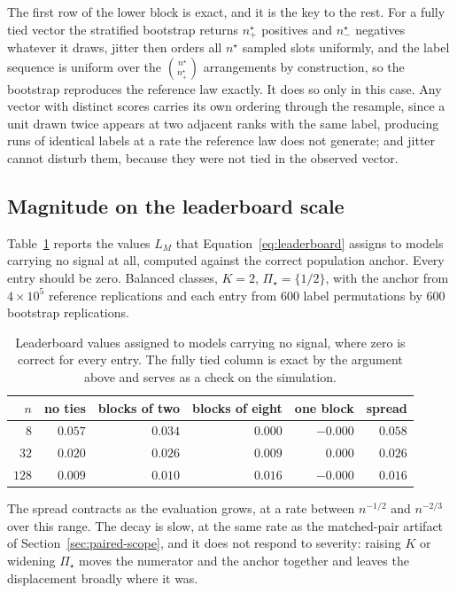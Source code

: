 \documentclass[11pt]{article}
\newcommand{\PSet}{\Pi_\star}
\theoremstyle{remark}
\begin{document}
The first row of the lower block is exact, and it is the key to the rest. For a fully tied vector the stratified bootstrap returns $n^\star_+$ positives and $n^\star_-$ negatives whatever it draws, jitter then orders all $n^\star$ sampled slots uniformly, and the label sequence is uniform over the $\binom{n^\star}{n^\star_+}$ arrangements by construction, so the bootstrap reproduces the reference law exactly. It does so only in this case. Any vector with distinct scores carries its own ordering through the resample, since a unit drawn twice appears at two adjacent ranks with the same label, producing runs of identical labels at a rate the reference law does not generate; and jitter cannot disturb them, because they were not tied in the observed vector.

\subsection{Magnitude on the leaderboard scale}

Table~\ref{tab:anchor-decay} reports the values $L_M$ that Equation~\eqref{eq:leaderboard} assigns to models carrying no signal at all, computed against the correct population anchor. Every entry should be zero. Balanced classes, $K=2$, $\PSet=\{1/2\}$, with the anchor from $4\times10^{5}$ reference replications and each entry from $600$ label permutations by $600$ bootstrap replications.

\begin{table}[ht]
\centering
\caption{Leaderboard values assigned to models carrying no signal, where zero is correct for every entry. The fully tied column is exact by the argument above and serves as a check on the simulation.}
\label{tab:anchor-decay}
\begin{tabular}{@{}rrrrrr@{}}
\toprule
$n$ & no ties & blocks of two & blocks of eight & one block & spread \\
\midrule
$8$ & $0.057$ & $0.034$ & $0.000$ & $-0.000$ & $0.058$ \\
$32$ & $0.020$ & $0.026$ & $0.009$ & $0.000$ & $0.026$ \\
$128$ & $0.009$ & $0.010$ & $0.016$ & $-0.000$ & $0.016$ \\
\bottomrule
\end{tabular}
\end{table}

The spread contracts as the evaluation grows, at a rate between $n^{-1/2}$ and $n^{-2/3}$ over this range. The decay is slow, at the same rate as the matched-pair artifact of Section~\ref{sec:paired-scope}, and it does not respond to severity: raising $K$ or widening $\PSet$ moves the numerator and the anchor together and leaves the displacement broadly where it was.
\end{document}
